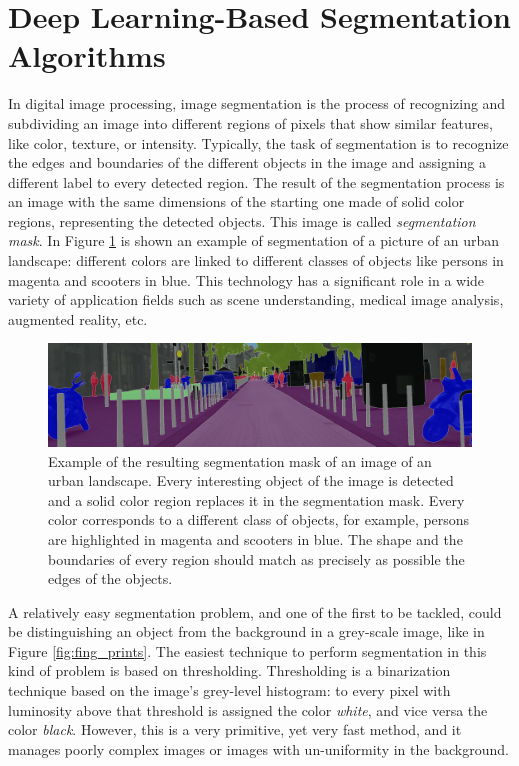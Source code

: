 \section{Deep Learning-Based Segmentation Algorithms} \label{ssec:segmentation}
In digital image processing, image segmentation is the process of recognizing and subdividing an image into different regions of pixels that show similar features, like color, texture, or intensity. Typically, the task of segmentation is to recognize the edges and boundaries of the different objects in the image and assigning a different label to every detected region. The result of the segmentation process is an image with the same dimensions of the starting one made of solid color regions, representing the detected objects. This image is called \textit{segmentation mask}. In Figure \ref{fig:seg_example} is shown an example of segmentation of a picture of an urban landscape: different colors are linked to different classes of objects like persons in magenta and scooters in blue. This technology has a significant role in a wide variety of application fields such as scene understanding, medical image analysis, augmented reality, etc.

\begin{figure}
    \centering
    \includegraphics[width = \textwidth]{images/seg_example}
    \caption{Example of the resulting segmentation mask of an image of an urban landscape. Every interesting object of the image is detected and a solid color region replaces it in the segmentation mask. Every color corresponds to a different class of objects, for example, persons are highlighted in magenta and scooters in blue. The shape and the boundaries of every region should match as precisely as possible the edges of the objects.}
    \label{fig:seg_example}
\end{figure}

A relatively easy segmentation problem, and one of the first to be tackled, could be distinguishing an object from the background in a grey-scale image, like in Figure \ref{fig:fing_prints}. The easiest technique to perform segmentation in this kind of problem is based on thresholding. Thresholding is a binarization technique based on the image's grey-level histogram: to every pixel with luminosity above that threshold is assigned the color \textit{white}, and vice versa the color \textit{black}. However, this is a very primitive, yet very fast method, and it manages poorly complex images or images with un-uniformity in the background.

